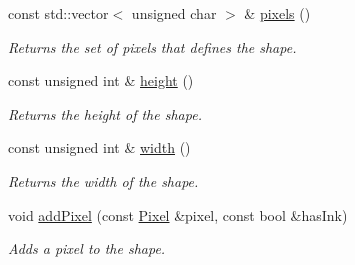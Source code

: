 \begin{CompactItemize}
const std::vector$<$ unsigned char $>$ \& \hyperlink{class_shape_7623c856a1a7916fc000f43d5efdba5b}{pixels} ()
\begin{CompactList}\small\item\em Returns the set of pixels that defines the shape. \item\end{CompactList}\item 
const unsigned int \& \hyperlink{class_shape_7a417d1fc74acae89f4d96ac36e0b73e}{height} ()
\begin{CompactList}\small\item\em Returns the height of the shape. \item\end{CompactList}\item 
const unsigned int \& \hyperlink{class_shape_aa9328cb87de52f53496b6a1eb3a60b9}{width} ()
\begin{CompactList}\small\item\em Returns the width of the shape. \item\end{CompactList}\item 
void \hyperlink{class_shape_813980f9a7b40e042a148c6ce5192111}{addPixel} (const \hyperlink{_pixel_8hpp_535e59456e3e633842529cfa8ea103c4}{Pixel} \&pixel, const bool \&hasInk)
\begin{CompactList}\small\item\em Adds a pixel to the shape. \item\end{CompactList}\end{CompactItemize}
